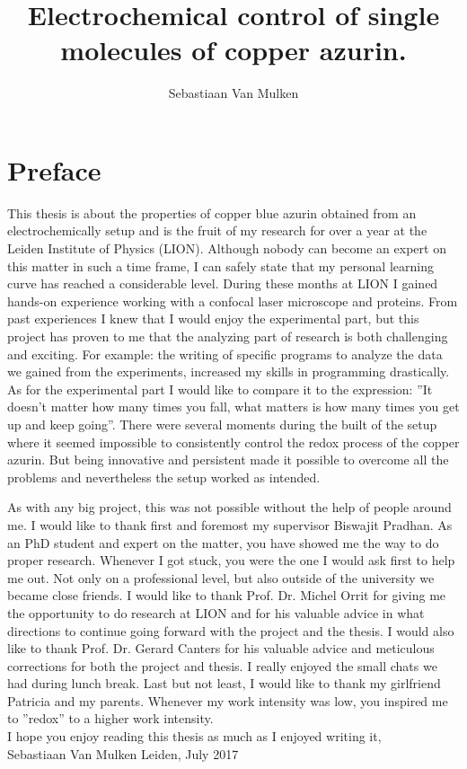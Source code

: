 \documentclass[twoside,single]{lion-msc}
\title{Electrochemical control of single molecules of copper azurin.}
\author{Sebastiaan Van Mulken}
\begin{document}
\maketitle

\chapter*{Preface}
This thesis is about the properties of copper blue azurin obtained from an electrochemically setup and is the fruit of my research for over a year at the Leiden Institute of Physics (LION). Although nobody can become an expert on this matter in such a time frame, I can safely state that my personal learning curve has reached a considerable level. During these months at LION I gained hands-on experience working with a confocal laser microscope and proteins. From past experiences I knew that I would enjoy the experimental part, but this project has proven to me that the analyzing part of research is both challenging and exciting. For example: the writing of specific programs to analyze the data we gained from the experiments, increased my skills in programming drastically. As for the experimental part I would like to compare it to the expression: ''It doesn't matter how many times you fall, what matters is how many times you get up and keep going''. There were several moments during the built of the setup where it seemed impossible to consistently control the redox process of the copper azurin. But being innovative and persistent made it possible to overcome all the problems and nevertheless the setup worked as intended.

As with any big project, this was not possible without the help of people around me. I would like to thank first and foremost my supervisor Biswajit Pradhan. As an PhD student and expert on the matter, you have showed me the way to do proper research. Whenever I got stuck, you were the one I would ask first to help me out. Not only on a professional level, but also outside of the university we became close friends. I would like to thank Prof. Dr. Michel Orrit for giving me the opportunity to do research at LION and for his valuable advice in what directions to continue going forward with the project and the thesis. I would also like to thank Prof. Dr. Gerard Canters for his valuable advice and meticulous corrections for both the project and thesis. I really enjoyed the small chats we had during lunch break. Last but not least, I would like to thank my girlfriend Patricia and my parents. Whenever my work intensity was low, you inspired me to ''redox'' to a higher work intensity.
\vspace{\baselineskip}
\\
I hope you enjoy reading this thesis as much as I enjoyed writing it,
\vspace{\baselineskip}
\\
Sebastiaan Van Mulken \hfill Leiden, July 2017
\end{document}
